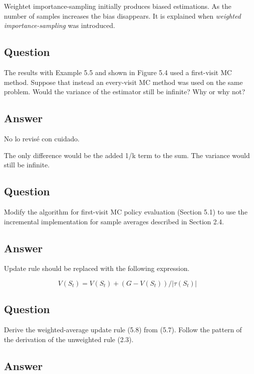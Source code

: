 \documentclass[11pt]{article}
\def\red{\color{red}}
\begin{document}
    Weightet importance-sampling initially produces biased estimations.
    As the number of samples increases the bias disappears. It is explained when {\it weighted importance-sampling} was introduced.

    \subsection{Question}

    The results with Example 5.5 and shown in Figure 5.4 used a first-visit MC method.
    Suppose that instead an every-visit MC method was used on the same problem.
    Would the variance of the estimator still be infinite? Why or why not?

    \subsection*{Answer}
{\red No lo revisé con cuidado.}

    The only difference would be the added 1/k term to the sum.
    The variance would still be infinite.

    \subsection{Question}

    Modify the algorithm for first-visit MC policy evaluation (Section 5.1) to use the incremental implementation for sample averages described in Section 2.4.

    \subsection*{Answer}

    Update rule should be replaced with the following expression.

    \begin{equation}
        V(S_{t}) = V(S_{t}) + (G - V(S_{t})) / |\tau(S_{t})|
    \end{equation}

    \subsection{Question}
    \label{question:derive-update-rule-5-8}

    Derive the weighted-average update rule (5.8) from (5.7).
    Follow the pattern of the derivation of the unweighted rule (2.3).

    \subsection*{Answer}
\end{document}
